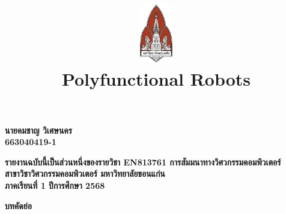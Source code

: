 \documentclass[a4paper]{article}
\date{}
\author{}
\title{
    \includegraphics[width=1in, height=1in, keepaspectratio]{logo.png}
    \\[2ex]
    {\fontsize{32pt}{36pt}\selectfont\textbf{Polyfunctional Robots}}
}
\begin{document}
\maketitle
\thispagestyle{empty}

\vfill
\begin{center}
    {\fontsize{22pt}{26pt}\selectfont\textbf{
        นายคมชาญ วิเศษนคร
        \\ 663040419-1
    }}
\end{center}
\vfill

\vfill
\begin{center}
    {\fontsize{16pt}{20pt}\selectfont\textbf{
        รายงานฉบับนี้เป็นส่วนหนึ่งของรายวิชา EN813761 การสัมมนาทางวิศวกรรมคอมพิวเตอร์
        \\ สาขาวิชาวิศวกรรมคอมพิวเตอร์ มหาวิทยาลัยขอนแก่น
        \\ ภาคเรียนที่ 1 ปีการศึกษา 2568
    }}
\end{center}

\newpage

\setcounter{page}{1}

\noindent
{\centering
    {\fontsize{18pt}{22pt}\selectfont\textbf{บทคัดย่อ}\par}
}
\end{document}
